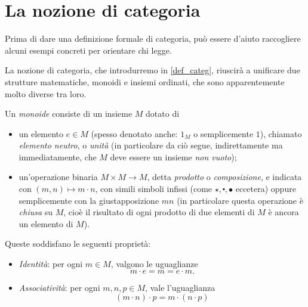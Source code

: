\section{La nozione di categoria}\label{sec_categorie}

Prima di dare una definizione formale di categoria, può essere d'aiuto raccogliere alcuni esempi concreti per orientare chi legge.

La nozione di categoria, che introdurremo in \ref{def_categ}, riuscirà a unificare due strutture matematiche, monoidi e insiemi ordinati, che sono apparentemente molto diverse tra loro.
\begin{definition}\label{prelim_def_monoide}
	Un \emph{monoide} consiste di un insieme \(M\) dotato di
	\begin{itemize}
		\item un elemento \(e\in M\) (spesso denotato anche: \(1_M\) o semplicemente \(1\)), chiamato \emph{elemento neutro}, o \emph{unità} (in particolare da ciò segue, indirettamente ma immediatamente, che \(M\) deve essere un insieme \emph{non vuoto});
		\item un'operazione binaria \(M\times M\to M\), detta \emph{prodotto} o \emph{composizione}, e indicata con \((m,n)\mapsto m\cdot n\), con simili simboli infissi (come \(\star, \centerdot,\bullet\) eccetera) oppure semplicemente con la giustapposizione	\(mn\) (in particolare questa operazione è \emph{chiusa} su \(M\), cioè il risultato di ogni prodotto di due elementi di \(M\) è ancora un elemento di \(M\)).
	\end{itemize}
	Queste soddisfano le seguenti proprietà:
	\begin{itemize}
		\item \emph{Identità}: per ogni \(m\in M\), valgono le uguaglianze
		      \[m\cdot e = m = e\cdot m.\]
		\item \emph{Associatività}: per ogni \(m,n,p\in M\), vale l'uguaglianza
		      \[(m\cdot n)\cdot p = m\cdot (n\cdot p)\]
	\end{itemize}
\end{definition}
